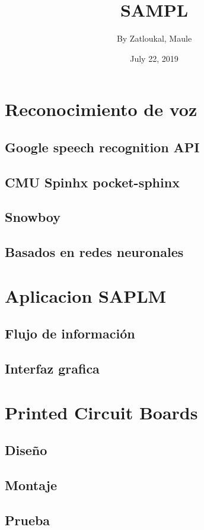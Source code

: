 \documentclass[12pt,onecolumn,a4paper]{report}
\title{\Large{\textbf{SAMPL}}}
\author{By Zatloukal, Maule}
\date{July 22, 2019}
\begin{document}
\maketitle

\tableofcontents

\chapter{Reconocimiento de voz}

\blindtext[1]
\section{Google speech recognition API}
\blindtext[5]
\section{CMU Spinhx pocket-sphinx}
\blindtext[5]
\section{Snowboy}
\blindtext[5]
\section{Basados en redes neuronales}
\blindtext[5]

\chapter{Aplicacion SAPLM}
\blindtext[1]
\section{Flujo de información}
\blindtext[5]
\section{Interfaz grafica}
\blindtext[5]

\chapter{Printed Circuit Boards}
\blindtext[1]
\section{Diseño}
\blindtext[5]
\section{Montaje}
\blindtext[5]
\section{Prueba}
\blindtext[5]
\end{document}
